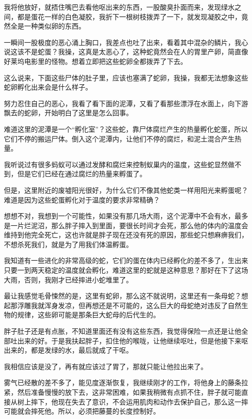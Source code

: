 我将他放好，就捂住嘴巴去看他呕出来的东西，一股酸臭扑面而来，发现绿水之间，都是蛋花一样的白色凝胶，我折下一根树枝拨弄了一下，就发现凝胶之中，竟然全是一种类似卵的东西。

一瞬间一股极度的恶心涌上胸口，我差点也吐了出来，看着其中混杂的鳞片，我心说这该不是蛇蛋？我操，这真是太恶心了，这种蛇竟然会在人的胃里产卵，简直像好莱坞电影里的怪物。想着立即把这些蛇卵全都拨弄了下去。

这么说来，下面这些尸体的肚子里，应该也塞满了蛇卵，我操，我都无法想象这些蛇卵孵化出来会是什么样子。

努力忍住自己的恶心，我看了看下面的泥潭，又看了看那些漂浮在水面上，向下游飘去的蛇卵，开始明白了这里是怎么回事。

难道这里的泥潭是一个“孵化室”？这些蛇，靠尸体腐烂产生的热量孵化蛇蛋，所以它们不停的搬运尸体。倒入这个泥潭内，让他们不停的腐烂，和泥土混合产生热量。

我听说过有很多蚂蚁可以通过发酵和腐烂来控制蚁巢内的温度，这些蛇显然做不到，但是它们已经在通过腐烂的热量来孵蛋了。

但是，这里附近的废墟阳光很好，为什么它们不像其他蛇类一样用阳光来孵蛋呢？难道是因为这些蛇蛋孵化对于温度的要求非常精确？

想想不对，我想到一个可能性，如果没有那几场大雨，这个泥潭中不会有水，最多是一片烂泥沼，那么胖子摔入到里面，要很长时间才会死，那么他的体内的温度会维持到他完全死亡，这也许就是胖子现在还没有死的原因，那些蛇只想麻痹我们，不想杀死我们，就是为了用我们体温孵蛋。

我知道有一些进化的非常高级的蛇，它们的蛋在体内已经孵化的差不多了，生出来只要一到两天稳定的温度就会孵化，难道这里的蛇就是这种意思？那好在下了这场大雨，否则，我刚才已经摔进小蛇堆里了。

最让我感觉毛骨悚然的是，这里有蛇卵，那么这不就说明，这里还有一条母蛇？想起那浮雕我就浑身发凉，但再想还是不可能的，这么巨大的母蛇绝对违反了自然生物的规律，这些卵可能是那条巨大蛇母的后代生的。

胖子肚子还是有点胀，不知道里面还有没有这些东西，我觉得保险一点还是让他全部吐出来的好。于是我扶起胖子，扣住他的喉咙，让他继续呕吐，但是他接下来呕出来的，都是发绿的水，最后就成了干呕。

我相信应该是没了，再有就应该过了胃了，那就只能让他拉出来了。

雾气已经散的差不多了，能见度逐渐恢复，我继续刚才的工作，将他身上的藤条拉紧，然后准备慢慢的放下去，这非常困难，如果我稍微有点抓不住，胖子就可能直接从树上摔下，他现在失去了意识，不会运用肌肉和动作去保护自己，那么这一摔可能就会摔死他。所以，必须把藤蔓的长度控制好。

